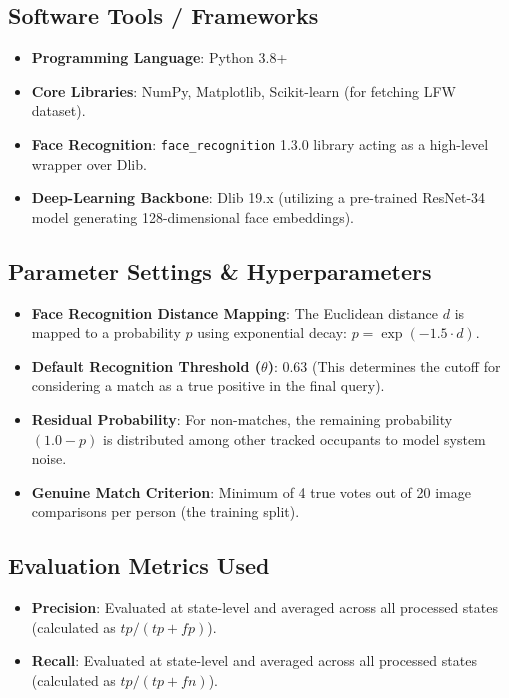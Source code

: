 \documentclass[12pt,a4paper]{article}
\begin{document}
\subsection*{Software Tools / Frameworks}
\begin{itemize}
    \item \textbf{Programming Language}: Python 3.8+
    \item \textbf{Core Libraries}: NumPy, Matplotlib, Scikit-learn (for fetching LFW dataset).
    \item \textbf{Face Recognition}: \texttt{face\_recognition} 1.3.0 library acting as a high-level wrapper over Dlib.
    \item \textbf{Deep-Learning Backbone}: Dlib 19.x (utilizing a pre-trained ResNet-34 model generating 128-dimensional face embeddings).
\end{itemize}

\subsection*{Parameter Settings \& Hyperparameters}
\begin{itemize}
    \item \textbf{Face Recognition Distance Mapping}: The Euclidean distance $d$ is mapped to a probability $p$ using exponential decay: $p = \exp(-1.5 \cdot d)$.
    \item \textbf{Default Recognition Threshold ($\theta$)}: $0.63$ (This determines the cutoff for considering a match as a true positive in the final query).
    \item \textbf{Residual Probability}: For non-matches, the remaining probability $(1.0 - p)$ is distributed among other tracked occupants to model system noise.
    \item \textbf{Genuine Match Criterion}: Minimum of 4 true votes out of 20 image comparisons per person (the training split).
\end{itemize}

\subsection*{Evaluation Metrics Used}
\begin{itemize}
    \item \textbf{Precision}: Evaluated at state-level and averaged across all processed states (calculated as $tp / (tp + fp)$).
    \item \textbf{Recall}: Evaluated at state-level and averaged across all processed states (calculated as $tp / (tp + fn)$).
\end{itemize}
\end{document}
